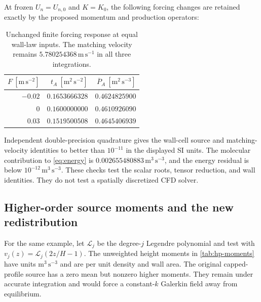 \documentclass[11pt,a4paper]{article}
\numberwithin{equation}{section}
\newcommand{\avg}[1]{\overline{#1}}
\newcommand{\units}[1]{\,\mathrm{#1}}
\begin{document}
At frozen $U_n=U_{n,0}$ and $K=K_0$, the following forcing changes are
retained exactly by the proposed momentum and production operators:
\begin{table}[htbp]
\centering\small
\begin{tabular}{@{}rrr@{}}
\toprule
$F\ [\mathrm{m\,s^{-2}}]$ &
$t_A\ [\mathrm{m^2\,s^{-2}}]$ &
$\avg P_A\ [\mathrm{m^2\,s^{-3}}]$\\
\midrule
$-0.02$ & $0.1653666328$ & $0.4624825900$\\
$0$ & $0.1600000000$ & $0.4610926090$\\
$0.03$ & $0.1519500508$ & $0.4645406939$\\
\bottomrule
\end{tabular}
\caption{Unchanged finite forcing response at equal wall-law inputs.
The matching velocity remains $5.780254368\units{m\,s^{-1}}$
in all three integrations.}
\label{tab:pressure}
\end{table}
Independent double-precision quadrature gives the wall-cell source and
matching-velocity identities to better than $10^{-11}$ in the displayed
SI units. The molecular contribution to \cref{eq:energy} is
$0.002655480883\units{m^3\,s^{-3}}$, and the energy residual is below
$10^{-12}\units{m^3\,s^{-3}}$.
These checks test the scalar roots, tensor reduction, and wall identities.
They do not test a spatially discretized CFD solver.

\subsection{Higher-order source moments and the new redistribution}
For the same example, let $\mathcal L_j$ be the degree-$j$ Legendre
polynomial and test with $v_j(z)=\mathcal L_j(2z/H-1)$. The unweighted
height moments in \cref{tab:hp-moments} have units
$\mathrm{m^3\,s^{-3}}$ and are per unit density and wall area.
The original capped-profile source has a zero mean but nonzero higher
moments. They remain under accurate integration and would force a
constant-$k$ Galerkin field away from equilibrium.
\end{document}
